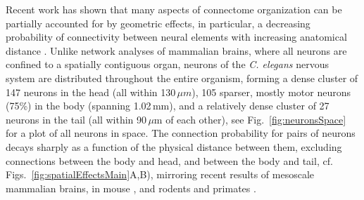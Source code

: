 \documentclass[10pt,letterpaper]{article}
\begin{document}
Recent work has shown that many aspects of connectome organization can be partially accounted for by geometric effects, in particular, a decreasing probability of connectivity between neural elements with increasing anatomical distance \cite{Henderson:2014fg, Roberts2016, Horvat:2016ia}.
Unlike network analyses of mammalian brains, where all neurons are confined to a spatially contiguous organ, neurons of the \emph{C. elegans} nervous system are distributed throughout the entire organism, forming a dense cluster of 147 neurons in the head (all within 130\,$\mu m$), 105 sparser, mostly motor neurons (75\%) in the body (spanning 1.02\,mm), and a relatively dense cluster of 27 neurons in the tail (all within 90\,$\mu$m of each other), see Fig.~\ref{fig:neuronsSpace} for a plot of all neurons in space.
The connection probability for pairs of neurons decays sharply as a function of the physical distance between them, excluding connections between the body and head, and between the body and tail, cf. Figs.~\ref{fig:spatialEffectsMain}A,B), mirroring recent results of mesoscale mammalian brains, in mouse \cite{Goulas:2016hr, Fulcher:2016ck}, and rodents and primates \cite{Horvat:2016ia}.
\end{document}
